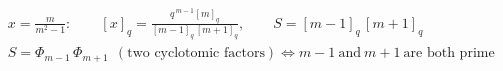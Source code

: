 \documentclass{article}
\begin{document}
\[
\begin{aligned}
&x=\frac{m}{m^{2}-1}:\qquad [x]_q=\frac{q^{\,m-1}[m]_q}{[m-1]_q\,[m+1]_q},\qquad S=[m-1]_q\,[m+1]_q\\
&S=\Phi_{m-1}\,\Phi_{m+1}\ \ (\text{two cyclotomic factors})\iff m-1\ \text{and}\ m+1\ \text{are both prime}
\end{aligned}
\]
\end{document}
